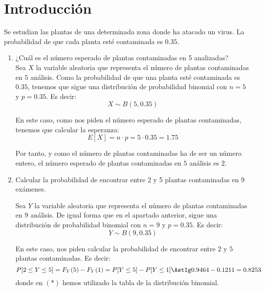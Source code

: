 \setcounter{section}{-1}
\section{Introducción}

\begin{ejercicio}
    Se estudian las plantas de una determinada zona donde ha atacado un virus. La probabilidad de
    que cada planta esté contaminada es $0.35$.
    \begin{enumerate}
        \item ¿Cuál es el número esperado de plantas contaminadas en 5 analizadas?\\
        Sea $X$ la variable aleatoria que representa el número de plantas contaminadas en $5$ análisis.
        Como la probabilidad de que una planta esté contaminada es $0.35$, tenemos que sigue una distribución de probabilidad binomial con $n=5$ y $p=0.35$. Es decir:
        \begin{equation*}
            X \sim B(5,0.35)
        \end{equation*}

        En este caso, como nos piden el número esperado de plantas contaminadas, tenemos que calcular la esperanza:
        \begin{equation*}
            E[X] = n \cdot p = 5 \cdot 0.35 = 1.75
        \end{equation*}

        Por tanto, y como el número de plantas contaminadas ha de ser un número entero, el número esperado de plantas contaminadas en $5$ análisis es $2$.

        \item Calcular la probabilidad de encontrar entre 2 y 5 plantas contaminadas en 9 exámenes.
        
        Sea $Y$ la variable aleatoria que representa el número de plantas contaminadas en $9$ análisis.
        De igual forma que en el apartado anterior, sigue una distribución de probabilidad binomial con $n=9$ y $p=0.35$. Es decir:
        \begin{equation*}
            Y \sim B(9,0.35)
        \end{equation*}

        En este caso, nos piden calcular la probabilidad de encontrar entre $2$ y $5$ plantas contaminadas. Es decir:
        \begin{equation*}
            P[2 \leq Y \leq 5] = F_Y(5) - F_Y(1) = P[Y\leq 5] - P[Y\leq 1] \AstIg 0.9464 - 0.1211 = 0.8253
        \end{equation*}
        donde en $(\ast)$ hemos utilizado la tabla de la distribución binomial.


\end{enumerate}
\end{ejercicio}
